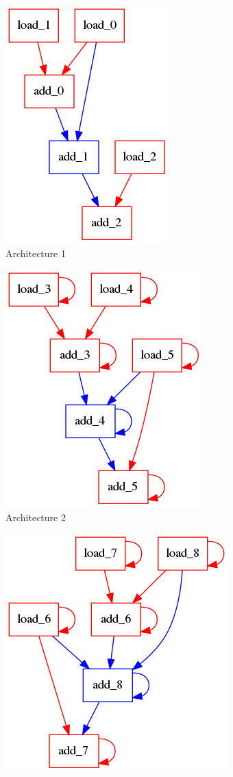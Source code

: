 \begin{figure}[!htb]
  \begin{subfigure}[t]{0.33\textwidth}
    \centering
    \includegraphics[scale=0.5]{graphs/test_multi_mcs1.png}
    \caption{Architecture 1}
    \label{fig:multimcs:a}
  \end{subfigure}
  \begin{subfigure}[t]{0.33\textwidth}
    \centering
    \includegraphics[scale=0.5]{graphs/test_multi_mcs2.png}
    \caption{Architecture 2}
    \label{fig:multimcs:b}
  \end{subfigure}
  \begin{subfigure}[t]{0.33\textwidth}
    \centering
    \includegraphics[scale=0.5]{graphs/test_multi_mcs.png}

\end{subfigure}
\end{figure}
